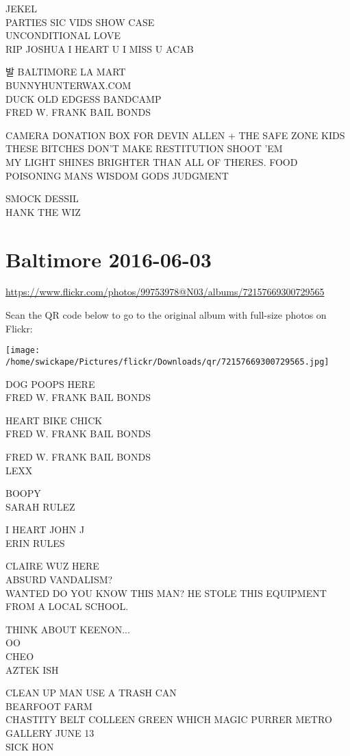 \documentclass[10pt,letterpaper]{article}
\begin{document}
JEKEL\\
PARTIES SIC VIDS SHOW CASE\\
UNCONDITIONAL LOVE\\
RIP JOSHUA I HEART U I MISS U ACAB

발 BALTIMORE LA MART\\
BUNNYHUNTERWAX.COM\\
DUCK OLD EDGESS BANDCAMP\\
FRED W. FRANK BAIL BONDS

CAMERA DONATION BOX FOR DEVIN ALLEN + THE SAFE ZONE KIDS\\
THESE BITCHES DON'T MAKE RESTITUTION SHOOT 'EM\\
MY LIGHT SHINES BRIGHTER THAN ALL OF THERES.  FOOD POISONING MANS WISDOM GODS JUDGMENT

SMOCK DESSIL\\
HANK THE WIZ
\pagebreak

\section*{Baltimore 2016-06-03}

\url{https://www.flickr.com/photos/99753978@N03/albums/72157669300729565}

Scan the QR code below to go to the original album with full-size photos on Flickr:

\texttt{[image: /home/swickape/Pictures/flickr/Downloads/qr/72157669300729565.jpg]}
\pagebreak

DOG POOPS HERE\\
FRED W. FRANK BAIL BONDS

HEART BIKE CHICK\\
FRED W. FRANK BAIL BONDS

FRED W. FRANK BAIL BONDS\\
LEXX

BOOPY\\
SARAH RULEZ

I HEART JOHN J\\
ERIN RULES

CLAIRE WUZ HERE\\
ABSURD VANDALISM?\\
WANTED DO YOU KNOW THIS MAN?  HE STOLE THIS EQUIPMENT FROM A LOCAL SCHOOL.

THINK ABOUT KEENON...\\
OO\\
CHEO\\
AZTEK ISH

CLEAN UP MAN USE A TRASH CAN\\
BEARFOOT FARM\\
CHASTITY BELT COLLEEN GREEN WHICH MAGIC PURRER METRO GALLERY JUNE 13\\
SICK HON
\end{document}
